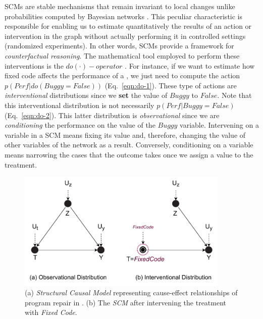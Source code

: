 SCMs are stable mechanisms that remain invariant to local changes unlike probabilities computed by Bayesian networks \citep{Pearl2016Causality}. This peculiar characteristic is responsible for enabling us to estimate quantitatively the results of an action or intervention in the graph without actually performing it in controlled settings (\ie randomized experiments). In other words, SCMs provide a framework for \textit{counterfactual reasoning}. The mathematical tool employed to perform these interventions is the $do(\cdot)-operator$ \citep{Pearl2009Causality}. For instance, if we want to estimate how fixed code affects the performance of a \nlm, we just need to compute the action $p(Perf|do(Buggy=False))$ (Eq.~\ref{eqn:do-1}). These type of actions are \textit{interventional} distributions since we \textbf{set} the value of $Buggy$ to $False$. Note that this interventional distribution is not necessarily $p(Perf|Buggy=False)$ (Eq.~\ref{eqn:do-2}). This latter distribution is \textit{observational} since we are \textit{conditioning} the performance on the value of the $Buggy$ variable. Intervening on a variable in a SCM means fixing its value and, therefore, changing the value of other variables of the network as a result. Conversely, conditioning on a variable means narrowing the cases that the outcome takes once we assign a value to the treatment.   

\begin{figure}[h]
		\centering
		\includegraphics[width=0.9\textwidth]{graphics/preliminaries/fig_1_causalnet.pdf}
		\caption{(a) \textit{Structural Causal Model} representing cause-effect relationships of program repair in \nlms. (b) The \textit{SCM} after intervening the treatment with \textit{Fixed Code}.}
        \label{fig:scm}
\end{figure}

